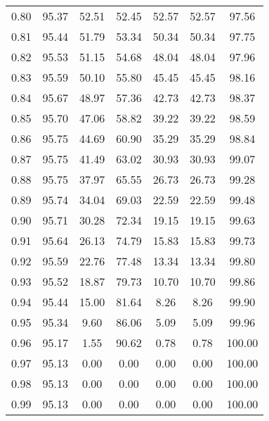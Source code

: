 \begin{tabular}{|c|c|c|c|c|c|c|}
      0.80 &     95.37 &     52.51 &      52.45 &   52.57 &      52.57 &         97.56 \\
      0.81 &     95.44 &     51.79 &      53.34 &   50.34 &      50.34 &         97.75 \\
      0.82 &     95.53 &     51.15 &      54.68 &   48.04 &      48.04 &         97.96 \\
      0.83 &     95.59 &     50.10 &      55.80 &   45.45 &      45.45 &         98.16 \\
      0.84 &     95.67 &     48.97 &      57.36 &   42.73 &      42.73 &         98.37 \\
      0.85 &     95.70 &     47.06 &      58.82 &   39.22 &      39.22 &         98.59 \\
      0.86 &     95.75 &     44.69 &      60.90 &   35.29 &      35.29 &         98.84 \\
      0.87 &     95.75 &     41.49 &      63.02 &   30.93 &      30.93 &         99.07 \\
      0.88 &     95.75 &     37.97 &      65.55 &   26.73 &      26.73 &         99.28 \\
      0.89 &     95.74 &     34.04 &      69.03 &   22.59 &      22.59 &         99.48 \\
      0.90 &     95.71 &     30.28 &      72.34 &   19.15 &      19.15 &         99.63 \\
      0.91 &     95.64 &     26.13 &      74.79 &   15.83 &      15.83 &         99.73 \\
      0.92 &     95.59 &     22.76 &      77.48 &   13.34 &      13.34 &         99.80 \\
      0.93 &     95.52 &     18.87 &      79.73 &   10.70 &      10.70 &         99.86 \\
      0.94 &     95.44 &     15.00 &      81.64 &    8.26 &       8.26 &         99.90 \\
      0.95 &     95.34 &      9.60 &      86.06 &    5.09 &       5.09 &         99.96 \\
      0.96 &     95.17 &      1.55 &      90.62 &    0.78 &       0.78 &        100.00 \\
      0.97 &     95.13 &      0.00 &       0.00 &    0.00 &       0.00 &        100.00 \\
      0.98 &     95.13 &      0.00 &       0.00 &    0.00 &       0.00 &        100.00 \\
      0.99 &     95.13 &      0.00 &       0.00 &    0.00 &       0.00 &        100.00 \\
\bottomrule
\end{tabular}
